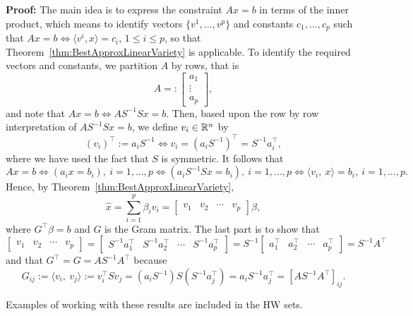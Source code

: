 \textbf{Proof:} The main idea is to express the constraint $Ax=b$ in terms of the inner product, which means to identify vectors $\{v^1, \ldots, v^p\}$ and constants $c_1, \ldots, c_p$ such that $Ax = b \iff \langle v^i, x \rangle = c_i$, $1 \le i \le p$, so that Theorem~\ref{thm:BestApproxLinearVariety} is applicable. To identify the required vectors and constants, we partition $A$ by rows, that is  
$$A=:\begin{bmatrix}a_1 \\ \vdots \\ a_p \end{bmatrix},$$
and note that $A x = b \iff A S^{-1} S x = b$. Then, based upon the row by row interpretation of $ A S^{-1} S x = b$, we define $v_i \in \mathbb R^n $ by
$$(v_i)^\top := a_i S^{-1} \iff v_i = (a_i S^{-1})^\top = S^{-1} a_i^\top,$$
where we have used the fact that $S$ is symmetric. It follows that
$$Ax = b \iff (a_i x = b_i), ~i = 1,...,p\iff  (a_i S^{-1} S x = b_i), ~i = 1,...,p \iff  \langle v_i, ~x \rangle = b_i, ~ i = 1,...,p.$$
Hence, by Theorem~\ref{thm:BestApproxLinearVariety}, 
$$\widehat{x}= \sum \limits_{i=1}^{p} \beta_i v_i =\left[ \begin{array}{cccc} v_1 & v_2 & \cdots & v_p \end{array} \right] \beta ,$$ where $G^\top \beta = b$ and $G$ is the Gram matrix. The last part is to show that 
$$\left[ \begin{array}{cccc} v_1 & v_2 & \cdots & v_p \end{array} \right] = \left[ \begin{array}{cccc} S^{-1} a_1^\top & S^{-1} a_2^\top & \cdots & S^{-1} a_p^\top \end{array} \right]=S^{-1} \left[ \begin{array}{cccc} a_1^\top &a_2^\top & \cdots & a_p^\top \end{array} \right] = S^{-1} A^\top$$
and that $G^\top = G = AS^{-1} A^\top$ because
$$G_{ij} := \langle v_i, ~v_j \rangle := v_i^\top S v_j =(a_i S^{-1})S (S^{-1} a_j^\top) = a_i S^{-1} a_j^\top = \left[AS^{-1} A^\top\right]_{ij}.$$
 \Qed
 
Examples of working with these results are included in the HW sets.
 
